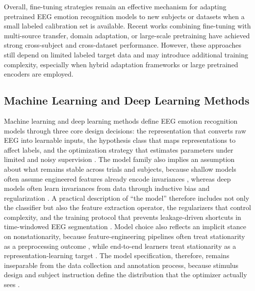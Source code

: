 \documentclass{WileyMSP-template}
\begin{document}
Overall, fine-tuning strategies remain an effective mechanism for adapting pretrained EEG emotion recognition models to new subjects or datasets when a small labeled calibration set is available. Recent works combining fine-tuning with multi-source transfer, domain adaptation, or large-scale pretraining have achieved strong cross-subject and cross-dataset performance. However, these approaches still depend on limited labeled target data and may introduce additional training complexity, especially when hybrid adaptation frameworks or large pretrained encoders are employed.



\subsection{Machine Learning and Deep Learning Methods}

Machine learning and deep learning methods define EEG emotion recognition models through three core design decisions: the representation that converts raw EEG into learnable inputs, the hypothesis class that maps representations to affect labels, and the optimization strategy that estimates parameters under limited and noisy supervision \cite{yroyhb2019deeplear}. The model family also implies an assumption about what remains stable across trials and subjects, because shallow models often assume engineered features already encode invariances \cite{smalar2019emotions}, whereas deep models often learn invariances from data through inductive bias and regularization \cite{wlizzh2021physiolo}. A practical description of ``the model'' therefore includes not only the classifier but also the feature extraction operator, the regularizers that control complexity, and the training protocol that prevents leakage-driven shortcuts in time-windowed EEG segmentation \cite{nssuha2020eegbased}. Model choice also reflects an implicit stance on nonstationarity, because feature-engineering pipelines often treat stationarity as a preprocessing outcome \cite{ztliuq2019electroe}, while end-to-end learners treat stationarity as a representation-learning target \cite{megger2019emotionr}. The model specification, therefore, remains inseparable from the data collection and annotation process, because stimulus design and subject instruction define the distribution that the optimizer actually sees \cite{ctanfs2018asurveyo}.
\end{document}
